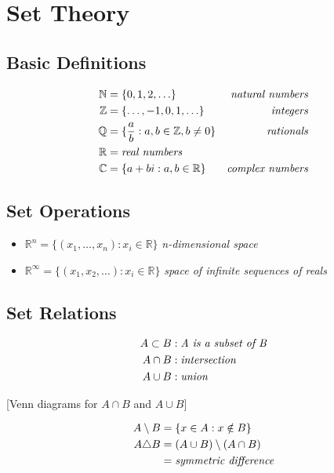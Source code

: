 \documentclass[12pt,a4paper]{article}
\begin{document}
\section{Set Theory}

\subsection{Basic Definitions}

\begin{align*}
\mathbb{N} &= \{0,1,2,\ldots\} & \text{\textit{natural numbers}} \\
\mathbb{Z} &= \{\ldots,-1,0,1,\ldots\} & \text{\textit{integers}} \\
\mathbb{Q} &= \{\frac{a}{b} : a,b \in \mathbb{Z}, b \neq 0\} & \text{\textit{rationals}} \\
\mathbb{R} &= \text{\textit{real numbers}} \\
\mathbb{C} &= \{a + bi : a,b \in \mathbb{R}\} & \text{\textit{complex numbers}}
\end{align*}

\subsection{Set Operations}

\begin{itemize}
\item $\mathbb{R}^n = \{(x_1,\ldots,x_n) : x_i \in \mathbb{R}\}$ \textit{n-dimensional space}
\item $\mathbb{R}^\infty = \{(x_1,x_2,\ldots) : x_i \in \mathbb{R}\}$ \textit{space of infinite sequences of reals}
\end{itemize}

\subsection{Set Relations}

\begin{align*}
A \subset B &: \text{\textit{A is a subset of B}} \\
A \cap B &: \text{\textit{intersection}} \\
A \cup B &: \text{\textit{union}}
\end{align*}

\begin{center}
[Venn diagrams for $A \cap B$ and $A \cup B$]
\end{center}

\begin{align*}
A \setminus B &= \{x \in A : x \notin B\} \\
A \triangle B &= (A \cup B) \setminus (A \cap B) \\
&= \text{\textit{symmetric difference}}
\end{align*}
\end{document}
